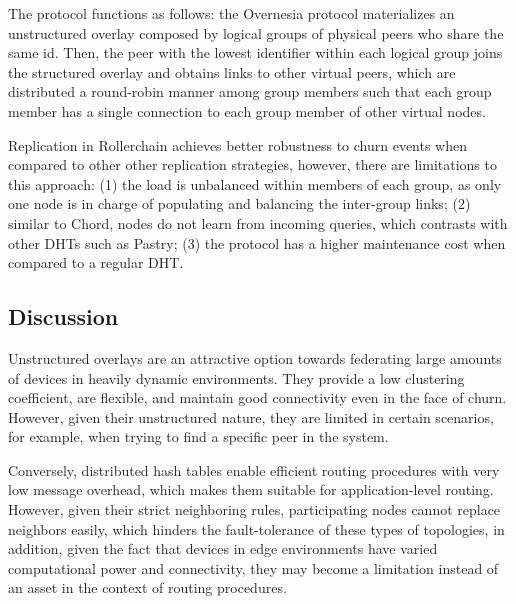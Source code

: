 The protocol functions as follows: the Overnesia protocol materializes an unstructured overlay composed by logical
groups of physical peers who share the same id. Then, the peer with the lowest identifier within each logical group
joins the structured overlay and obtains links to other virtual peers, which are distributed a round-robin manner among group members such that each group member has a single connection to each group member of other virtual nodes.

Replication in Rollerchain achieves better robustness to churn events when compared to other other replication strategies,
however, there are limitations to this approach: (1) the load is unbalanced within members of each group, as only one node  is in charge of populating and balancing the inter-group links; (2) similar to Chord, nodes do not learn from incoming queries, which contrasts with other DHTs such as Pastry; (3) the protocol has a higher maintenance cost when compared to a regular DHT.

\subsection{Discussion}

Unstructured overlays are an attractive option towards federating large amounts of devices in heavily dynamic environments. They provide a low clustering coefficient, are flexible, and maintain good connectivity even in the face of churn. However, given their unstructured nature, they are limited in certain scenarios, for example, when trying to find a specific peer in the system.

Conversely, distributed hash tables enable efficient routing procedures with very low message overhead, which makes them suitable for application-level routing. However, given their strict neighboring rules, participating nodes cannot replace neighbors easily, which hinders the fault-tolerance of these types of topologies, in addition, given the fact that devices in edge environments have varied computational power and connectivity, they may become a limitation instead of an asset in the context of routing procedures. 




